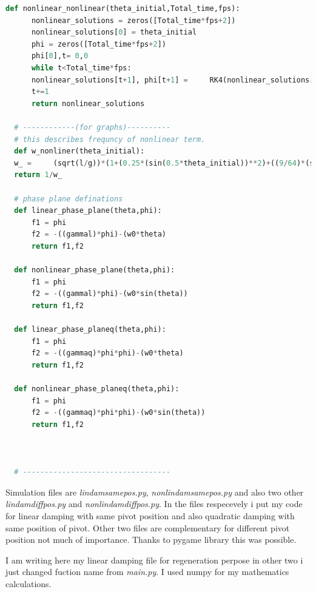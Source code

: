 \documentclass{article}
\begin{document}
\begin{lstlisting}[language=Python]
  def nonlinear_nonlinear(theta_initial,Total_time,fps):
      nonlinear_solutions = zeros([Total_time*fps+2])
      nonlinear_solutions[0] = theta_initial
      phi = zeros([Total_time*fps+2])
      phi[0],t= 0,0
      while t<Total_time*fps:
      nonlinear_solutions[t+1], phi[t+1] =     RK4(nonlinear_solutions[t],phi[t],1/fps,f2nonlinear_nonlinear)
      t+=1
      return nonlinear_solutions

  # ------------(for graphs)----------
  # this describes frequncy of nonlinear term.
  def w_nonliner(theta_initial):
  w_ =     (sqrt(l/g))*(1+(0.25*(sin(0.5*theta_initial))**2)+((9/64)*(sin(theta_initial*0.5))**4))
  return 1/w_

  # phase plane definations
  def linear_phase_plane(theta,phi):
      f1 = phi
      f2 = -((gammal)*phi)-(w0*theta)
      return f1,f2

  def nonlinear_phase_plane(theta,phi):
      f1 = phi
      f2 = -((gammal)*phi)-(w0*sin(theta))
      return f1,f2

  def linear_phase_planeq(theta,phi):
      f1 = phi
      f2 = -((gammaq)*phi*phi)-(w0*theta)
      return f1,f2

  def nonlinear_phase_planeq(theta,phi):
      f1 = phi
      f2 = -((gammaq)*phi*phi)-(w0*sin(theta))
      return f1,f2



  # ----------------------------------

\end{lstlisting}

Simulation files are \emph{lindamsamepos.py}, \emph{nonlindamsamepos.py} and also two other \emph{lindamdiffpos.py} and \emph{nonlindamdiffpos.py}. In the files respecevely i put my code for linear damping with same pivot position and also quadratic damping with same position of pivot. Other two files are complementary for different pivot position not much of importance. Thanks to pygame library this was possible. 

I am writing here my linear damping file for regeneration perpose in other two i just changed fuction name from \emph{main.py}. I used numpy for my mathematics calculations.\cite{harris2020array} 
\end{document}
